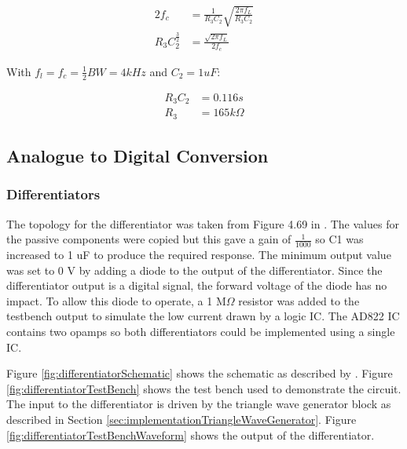 \begin{equation}
    \begin{split}
        2f_{c} &= \frac{1}{R_{3}C_{2}}\sqrt{\frac{2\pi f_{L}}{R_{3}C_{2}}}\\
        R_{3}C_{2}^{\frac{3}{2}} &= \frac{\sqrt{2\pi f_{L}}}{2f_{c}}
    \end{split}
    \label{eqn:pllBandwidth}
\end{equation}

With $f_{l} = f_{c} = \frac{1}{2}BW = 4 kHz$ and $C_{2} = 1 uF$:

\begin{equation*}
    \begin{split}
        R_{3}C_{2} &= 0.116s\\
        R_{3} &= 165 k\Omega
    \end{split}
\end{equation*}

\subsection{Analogue to Digital Conversion}

\subsubsection{Differentiators}
The topology for the differentiator was taken from Figure 4.69 in \cite{DifferentiatorTopology}.
The values for the passive components were copied but this gave a gain of $\frac{1}{1000}$ so C1 was increased to 1 uF to produce the required response. 
The minimum output value was set to 0 V by adding a diode to the output of the differentiator. 
Since the differentiator output is a digital signal, the forward voltage of the diode has no impact.
To allow this diode to operate, a 1 M$\Omega$ resistor was added to the testbench output to simulate the low current drawn by a logic IC. 
The AD822 IC contains two opamps so both differentiators could be implemented using a single IC.

Figure \ref{fig:differentiatorSchematic} shows the schematic as described by \citeauthor{DifferentiatorTopology}\cite{DifferentiatorTopology}.
Figure \ref{fig:differentiatorTestBench} shows the test bench used to demonstrate the circuit. 
The input to the differentiator is driven by the triangle wave generator block as described in Section \ref{sec:implementationTriangleWaveGenerator}.
Figure \ref{fig:differentiatorTestBenchWaveform} shows the output of the differentiator. 

